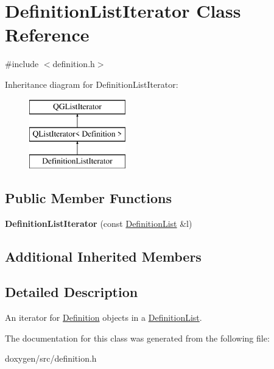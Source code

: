 \hypertarget{class_definition_list_iterator}{}\section{Definition\+List\+Iterator Class Reference}
\label{class_definition_list_iterator}


{\ttfamily \#include $<$definition.\+h$>$}

Inheritance diagram for Definition\+List\+Iterator\+:\begin{figure}[H]
\begin{center}
\leavevmode
\includegraphics[height=3.000000cm]{class_definition_list_iterator}
\end{center}
\end{figure}
\subsection*{Public Member Functions}
\begin{DoxyCompactItemize}
\item 
\mbox{\label{class_definition_list_iterator_ac6b954bf1835c10d27c1c8b965719866}} 
{\bfseries Definition\+List\+Iterator} (const \mbox{\hyperlink{class_definition_list}{Definition\+List}} \&l)
\end{DoxyCompactItemize}
\subsection*{Additional Inherited Members}


\subsection{Detailed Description}
An iterator for \mbox{\hyperlink{class_definition}{Definition}} objects in a \mbox{\hyperlink{class_definition_list}{Definition\+List}}. 

The documentation for this class was generated from the following file\+:\begin{DoxyCompactItemize}
\item 
doxygen/src/definition.\+h\end{DoxyCompactItemize}
